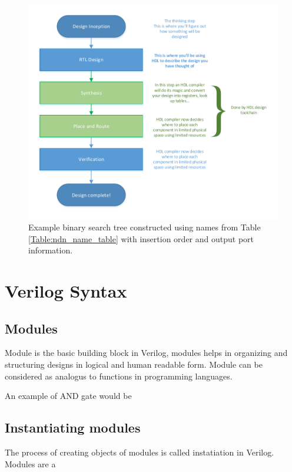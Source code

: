 \documentclass[a4paper,10pt]{article}
\theoremstyle{mytheor}
\newcommand{
  \insertverilog}[3]{
  
}
\begin{document}
\begin{figure}[!t] \centering 
  \includegraphics[width=\linewidth]{./resources/hdl_design_flow.pdf}
  \caption{Example binary search tree constructed using names from Table \ref{Table:ndn_name_table} with insertion order and output port information.}
  \label{Fig:bst_sample_names}
\end{figure} 

\section*{Verilog Syntax}
\subsection*{Modules}
Module is the basic building block in Verilog, modules helps in organizing and structuring designs in logical and human readable form. Module can be considered as analogus to functions in programming languages.

\insertverilog{./verilog_files/module.v}{sample-module}{\text{Sample module indicating its structure}}

An example of AND gate would be
\insertverilog{./verilog_files/andGate.v}{sample-module}{\text{Illustrative AND gate module}}

\subsection*{Instantiating modules}
The process of creating objects of modules is called instatiation in Verilog. Modules are a
  
\end{document}
